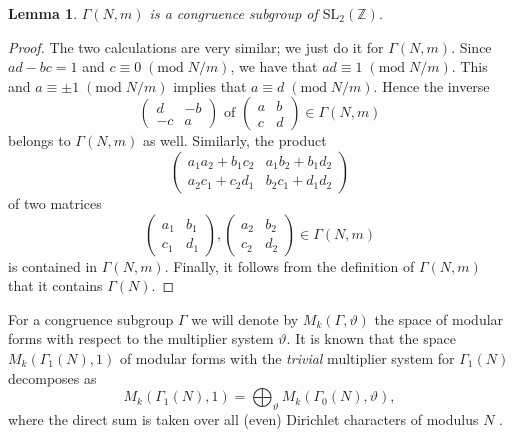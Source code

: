 \documentclass[11pt,a4paper]{amsart}
\newtheorem{lemma}[theorem]{Lemma}
\theoremstyle{definition}
\newcommand{\SZ}{\mathbb{Z}}                    %
\begin{document}
\begin{lemma} $\Gamma(N,m)$ is a congruence subgroup of $\mathrm{SL_2}(\SZ)$.
\end{lemma}
\begin{proof} The two calculations are very similar; we just do it for $\Gamma(N,m)$.
Since $ad-bc=1$ and $c\equiv 0  \;(\mathrm{mod}\;N/m)$, we have that $ad\equiv 1  \;(\mathrm{mod}\;N/m)$. This and $a \equiv \pm 1 \;(\mathrm{mod}\;N/m)$ implies that $a\equiv d  \;(\mathrm{mod}\;N/m)$. Hence the inverse
\[\begin{pmatrix} d & -b \\ -c & a \end{pmatrix} \textrm{ of } \begin{pmatrix} a & b \\ c & d \end{pmatrix} \in \Gamma(N,m)\]
belongs to $\Gamma(N,m)$ as well. Similarly, the product
\[ 
\begin{pmatrix} a_1a_2+b_1c_2 & a_1b_2+b_1d_2 \\ a_2c_1+c_2d_1 & b_2c_1+d_1d_2 \end{pmatrix}
\]
\textrm{ of two matrices }
\[\begin{pmatrix} a_1 & b_1 \\ c_1 & d_1 \end{pmatrix}, \begin{pmatrix} a_2 & b_2 \\ c_2 & d_2 \end{pmatrix} \in \Gamma(N,m) \]
is contained in $\Gamma(N,m)$. Finally, it follows from the definition of $\Gamma(N,m)$ that it contains $\Gamma(N)$.
\end{proof}

For a congruence subgroup $\Gamma$ we will denote by $ M_k(\Gamma, \vartheta)$ the space of modular forms with respect to the multiplier system $\vartheta$. It is known that the space $M_k(\Gamma_1(N), 1)$ of modular forms with the \emph{trivial} multiplier system for $\Gamma_1(N)$ decomposes as
\[ M_k(\Gamma_1(N), 1)= \bigoplus_{\vartheta} M_k(\Gamma_0(N), \vartheta), \]
where the direct sum is taken over all (even) Dirichlet characters of modulus $N$ \cite{serre1977modular}.


\end{document}
